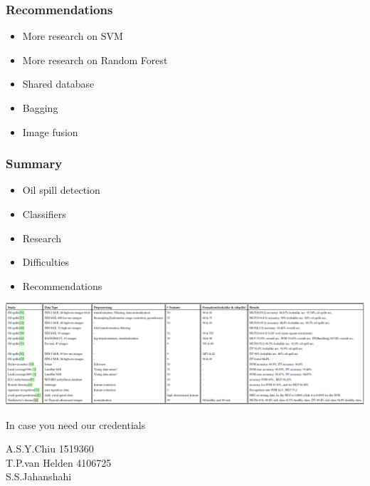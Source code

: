 \documentclass{beamer}
\begin{document}
\begin{frame}
\frametitle{Recommendations}
\begin{itemize}
	\item More research on SVM
	\item More research on Random Forest
	\item Shared database
	\item Bagging
	\item Image fusion

\end{itemize}
\end{frame}


\begin{frame}
\frametitle{Summary}
\begin{itemize}
	\item Oil spill detection
	\item Classifiers
	\item Research
	\item Difficulties
	\item Recommendations

\end{itemize}
\end{frame}


\begin{frame}

\end{frame}

\begin{frame}

\includegraphics[width=\textwidth]{./img/table.png}

\end{frame}

\begin{frame}
In case you need our credentials

A.S.Y.Chiu 1519360\\ T.P.van Helden 4106725\\ S.S.Jahanshahi 


\end{frame}
\end{document}
